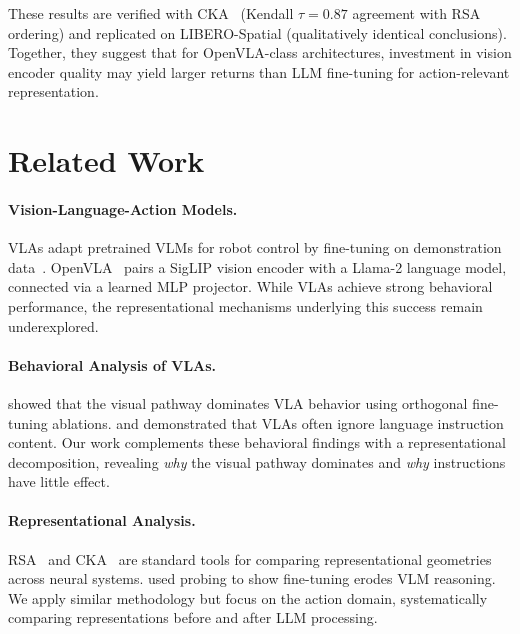 \documentclass[letterpaper]{article}
\begin{document}
These results are verified with CKA~\citep{kornblith2019cka} (Kendall $\tau=0.87$ agreement with RSA ordering) and replicated on LIBERO-Spatial (qualitatively identical conclusions).
Together, they suggest that for OpenVLA-class architectures, investment in vision encoder quality may yield larger returns than LLM fine-tuning for action-relevant representation.

\section{Related Work}
\label{sec:related}

\paragraph{Vision-Language-Action Models.}
VLAs adapt pretrained VLMs for robot control by fine-tuning on demonstration data~\citep{brohan2023rt2,kim2024openvla}.
OpenVLA~\citep{kim2024openvla} pairs a SigLIP vision encoder with a Llama-2 language model, connected via a learned MLP projector.
While VLAs achieve strong behavioral performance, the representational mechanisms underlying this success remain underexplored.

\paragraph{Behavioral Analysis of VLAs.}
\citet{grant2026visual} showed that the visual pathway dominates VLA behavior using orthogonal fine-tuning ablations.
\citet{hou2026langgap} and \citet{fei2025liberoplus} demonstrated that VLAs often ignore language instruction content.
Our work complements these behavioral findings with a representational decomposition, revealing \emph{why} the visual pathway dominates and \emph{why} instructions have little effect.

\paragraph{Representational Analysis.}
RSA~\citep{kriegeskorte2008rsa} and CKA~\citep{kornblith2019cka} are standard tools for comparing representational geometries across neural systems.
\citet{fang2025finetuning} used probing to show fine-tuning erodes VLM reasoning.
We apply similar methodology but focus on the action domain, systematically comparing representations before and after LLM processing.
\end{document}

